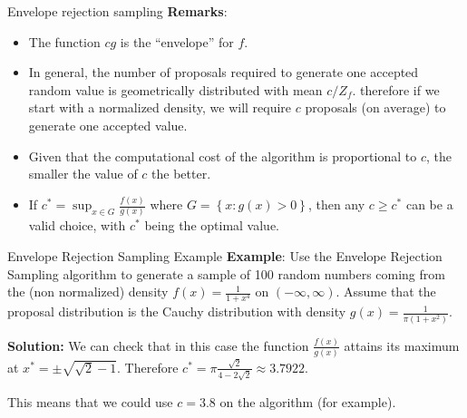 \documentclass[8pt]{beamer}
\begin{document}
\begin{frame}{Envelope rejection sampling}
\textbf{Remarks}: 

\begin{itemize}
	\item The function $cg$ is the ``envelope'' for $f$.
	\item In general, the number of proposals required to generate one accepted random value is geometrically distributed with mean $c/Z_f$. therefore if we start with a normalized density, we will require $c$ proposals (on average) to generate one accepted value.
	\item Given that the computational cost of the algorithm is proportional to $c$, the smaller the value of $c$ the better. 
	\item  If $\displaystyle{c^*=\sup_{x \in G} \frac{f(x)}{g(x)}}$ where $G=\left\{ x: g(x) >0 \right\}$, then any $c\geq c^*$ can be a valid choice, with $c^*$ being the optimal value. 
\end{itemize}
\end{frame}

\begin{frame}{Envelope Rejection Sampling Example}
\textbf{Example}: Use the Envelope Rejection Sampling algorithm to generate a sample of 100 random numbers coming from the (non normalized) density $\displaystyle{f(x)=\frac{1}{1+x^4}}$ on $(-\infty, \infty)$. Assume that the proposal distribution is the Cauchy distribution with density $\displaystyle{g(x)=\frac{1}{\pi(1+x^2)}}$.

\pause
\vspace{2mm}

{\bf Solution:} We can check that in this case the function $\displaystyle{\frac{f(x)}{g(x)}}$ attains its maximum at $\displaystyle{x^*=\pm\sqrt{\sqrt{2}-1}}$. Therefore $\displaystyle{c^*= \pi \frac{\sqrt{2}}{4-2\sqrt{2}}
\approx 3.7922}$.

\vspace{2mm}

This means that we could use $c=3.8$ on the algorithm (for example).
\end{frame}
\end{document}
